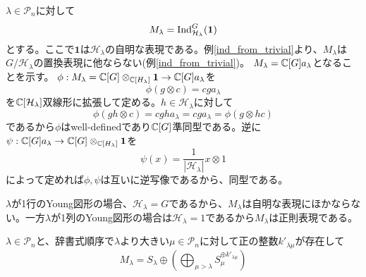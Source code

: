 \documentclass{ltjsreport}
\begin{document}
  $\lambda\in\mathcal{P}_n$に対して
  \[
  M_\lambda=\text{Ind}_{\mathcal{H}_\lambda}^{G}(\mathbf{1})  
  \]
  とする。ここで$\mathbf{1}$は$\mathcal{H}_\lambda$の自明な表現である。例\ref{ind_from_trivial}より、$M_\lambda$は$G/\mathcal{H}_\lambda$の置換表現に他ならない(例\ref{ind_from_trivial})。
  $M_\lambda=\mathbb{C}[G]a_\lambda$となることを示す。
  $\phi:M_\lambda=\mathbb{C}[G]\otimes_{\mathbb{C}[H_\lambda]} \mathbf{1}\rightarrow \mathbb{C}[G]a_\lambda$を
  \[
  \phi(g\otimes c)=cga_\lambda  
  \]
  を$\mathbb{C}[\mathcal{H}_\lambda]$双線形に拡張して定める。$h\in\mathcal{H}_\lambda$に対して
  \[
  \phi(gh\otimes c)=cgha_\lambda=cga_\lambda=\phi(g\otimes hc)
  \]
  であるから$\phi$はwell-definedであり$\mathbb{C}[G]$準同型である。逆に$\psi:\mathbb{C}[G]a_\lambda\rightarrow\mathbb{C}[G]\otimes_{\mathbb{C}[H_\lambda]} \mathbf{1}$を
  \[
  \psi(x)=\frac{1}{|\mathcal{H}_\lambda|}x\otimes 1
  \]
  によって定めれば$\phi,\psi$は互いに逆写像であるから、同型である。
  
  $\lambda$が1行のYoung図形の場合、$\mathcal{H}_\lambda=G$であるから、$M_\lambda$は自明な表現にほかならない。一方$\lambda$が1列のYoung図形の場合は$\mathcal{H}_\lambda=1$であるから$M_\lambda$は正則表現である。



\begin{theo}[Youngの規則]\label{Young_rule_for_rep}
  $\lambda\in\mathcal{P}_n$と、辞書式順序で$\lambda$より大きい$\mu\in\mathcal{P}_n$に対して正の整数$k'_{\lambda\mu}$が存在して
  \[
  M_\lambda=S_\lambda\oplus \left(\bigoplus_{\mu>\lambda}S_\mu^{\oplus k'_{\lambda\mu}}\right)
  \]
\end{theo}
\end{document}
